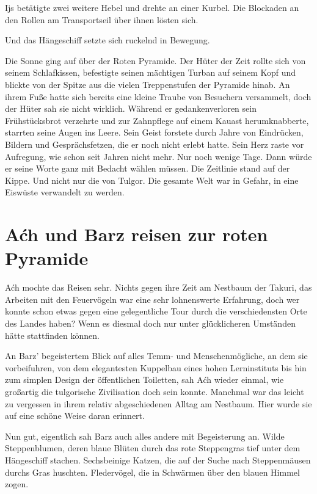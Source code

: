 Ijs betätigte zwei weitere Hebel und drehte an einer Kurbel. Die Blockaden an den Rollen am Transportseil über ihnen lösten sich.

Und das Hängeschiff setzte sich ruckelnd in Bewegung.



\trennzeichen



Die Sonne ging auf über der Roten Pyramide. Der Hüter der Zeit rollte sich von seinem Schlafkissen, befestigte seinen mächtigen Turban auf seinem Kopf und blickte von der Spitze aus die vielen Treppenstufen der Pyramide hinab. An ihrem Fuße hatte sich bereits eine kleine Traube von Besuchern versammelt, doch der Hüter sah sie nicht wirklich. Während er gedankenverloren sein Frühstücksbrot verzehrte und zur Zahnpflege auf einem Kauast herumknabberte, starrten seine Augen ins Leere. Sein Geist forstete durch Jahre von Eindrücken, Bildern und Gesprächsfetzen, die er noch nicht erlebt hatte. Sein Herz raste vor Aufregung, wie schon seit Jahren nicht mehr. Nur noch wenige Tage. Dann würde er seine Worte ganz mit Bedacht wählen müssen. Die Zeitlinie stand auf der Kippe. Und nicht nur die von Tulgor. Die gesamte Welt war in Gefahr, in eine Eiswüste verwandelt zu werden.





\newpage
\section{Aćh und Barz reisen zur roten Pyramide}



Aćh mochte das Reisen sehr. Nichts gegen ihre Zeit am Nestbaum der Takuri, das Arbeiten mit den Feuervögeln war eine sehr lohnenswerte Erfahrung, doch wer konnte schon etwas gegen eine gelegentliche Tour durch die verschiedensten Orte des Landes haben? Wenn es diesmal doch nur unter glücklicheren Umständen hätte stattfinden können.

An Barz’ begeistertem Blick auf alles Temm- und Menschenmögliche, an dem sie vorbeifuhren, von dem elegantesten Kuppelbau eines hohen Lerninstituts bis hin zum simplen Design der öffentlichen Toiletten, sah Aćh wieder einmal, wie großartig die tulgorische Zivilisation doch sein konnte. Manchmal war das leicht zu vergessen in ihrem relativ abgeschiedenen Alltag am Nestbaum. Hier wurde sie auf eine schöne Weise daran erinnert.

Nun gut, eigentlich sah Barz auch alles andere mit Begeisterung an. Wilde Steppenblumen, deren blaue Blüten durch das rote Steppengras tief unter dem Hängeschiff stachen. Sechsbeinige Katzen, die auf der Suche nach Steppenmäusen durchs Gras huschten. Fledervögel, die in Schwärmen über den blauen Himmel zogen.

